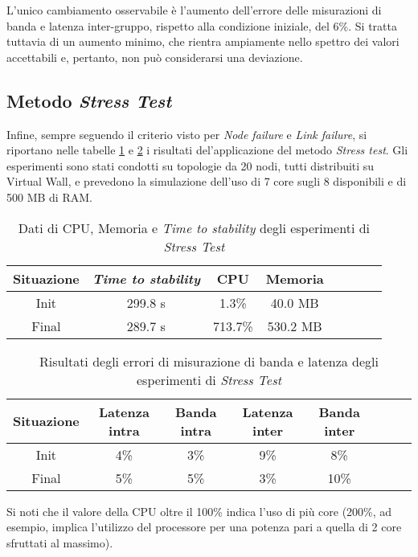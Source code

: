        L'unico cambiamento osservabile è l'aumento dell'errore delle misurazioni di banda e latenza inter-gruppo, rispetto alla condizione iniziale, del 6\%. Si tratta tuttavia di un aumento minimo, che rientra ampiamente nello spettro dei valori accettabili e, pertanto, non può considerarsi una deviazione.
        \subsection{Metodo \textit{Stress Test}}
       Infine, sempre seguendo il criterio visto per \textit{Node failure} e \textit{Link failure}, si riportano nelle tabelle  \ref{tab:stresstest}  e  \ref{tab:stresstestqos}  i risultati del'applicazione del metodo \textit{Stress test}. Gli esperimenti sono stati condotti su topologie da 20 nodi, tutti distribuiti su Virtual Wall, e prevedono la simulazione dell'uso di 7 core sugli 8 disponibili e di 500 MB di RAM.
        
        \begin{table}[H]
            \caption{Dati di CPU, Memoria e \textit{Time to stability} degli esperimenti di \textit{Stress Test}}
            \label{tab:stresstest}
            \begin{center}
                \begin{tabular}{|c|c|c|c|c|c|c|c|}
                     \hline
                    Situazione & \textit{Time to stability} & CPU & Memoria\\
                    \hline
                    Init & 299.8 s & 1.3\% & 40.0 MB\\
                    \hline
                    Final & 289.7 s  & 713.7\% & 530.2 MB\\
                    \hline
                \end{tabular}
            \end{center}
        \end{table}
        
        \begin{table}[H]
            \caption{Risultati degli errori di misurazione di banda e latenza degli esperimenti di \textit{Stress Test}}
            \label{tab:stresstestqos}
            \begin{center}
                \begin{tabular}{|c|c|c|c|c|c|c|c|}
                    \hline
                    Situazione & Latenza intra & Banda intra & Latenza inter & Banda inter\\
                    \hline
                    Init & 4\% &  3\%  &  9\% &  8\%\\
                    \hline
                    Final & 5\% &  5\%  &  3\% &  10\%\\
                    \hline
                \end{tabular}
            \end{center}
        \end{table}
        Si noti che il valore della CPU oltre il 100\% indica l'uso di più core (200\%, ad esempio, implica l'utilizzo del processore per una potenza pari a quella di 2 core sfruttati al massimo).
        
